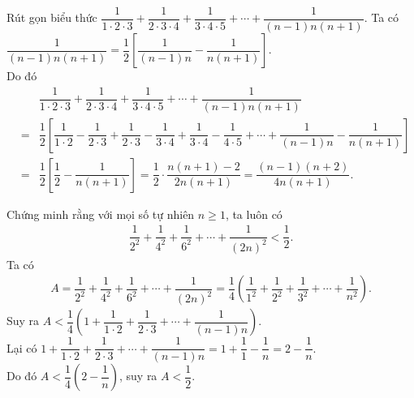 \begin{bt}%
 Rút gọn biểu thức $\dfrac{1}{1 \cdot 2 \cdot 3} + \dfrac{1}{2 \cdot 3 \cdot 4} + \dfrac{1}{3 \cdot 4 \cdot 5} + \cdots + \dfrac{1}{(n-1)n(n+1)}$.
 \loigiai
  {
  Ta có $\dfrac{1}{(n-1)n(n+1)} = \dfrac{1}{2}\left[\dfrac{1}{(n-1)n}-\dfrac{1}{n(n+1)}\right]$.\\
  Do đó
  \allowdisplaybreaks
  \begin{eqnarray*}
   & & \dfrac{1}{1 \cdot 2 \cdot 3} + \dfrac{1}{2 \cdot 3 \cdot 4} + \dfrac{1}{3 \cdot 4 \cdot 5} + \cdots + \dfrac{1}{(n-1)n(n+1)}\\
   &=& \dfrac{1}{2} \left[\dfrac{1}{1 \cdot 2} - \dfrac{1}{2 \cdot 3} + \dfrac{1}{2 \cdot 3}-\dfrac{1}{3 \cdot 4} + \dfrac{1}{3 \cdot 4}-\dfrac{1}{4 \cdot 5} + \cdots + \dfrac{1}{(n-1)n}-\dfrac{1}{n(n+1)}\right]\\
   &=& \dfrac{1}{2}\left[\dfrac{1}{2}-\dfrac{1}{n(n+1)}\right] = \dfrac{1}{2} \cdot \dfrac{n(n+1)-2}{2n(n+1)} = \dfrac{(n-1)(n+2)}{4n(n+1)}.
  \end{eqnarray*}
  }
\end{bt}

\begin{bt}%
 Chứng minh rằng với mọi số tự nhiên $n \geq 1$, ta luôn có
 \begin{eqnarray*}
  \dfrac{1}{2^2} + \dfrac{1}{4^2} + \dfrac{1}{6^2} + \cdots + \dfrac{1}{(2n)^2} < \dfrac{1}{2}.
 \end{eqnarray*}
 \loigiai
  {
  Ta có
  \allowdisplaybreaks
  \begin{eqnarray*}
   A = \dfrac{1}{2^2} + \dfrac{1}{4^2} + \dfrac{1}{6^2} + \cdots + \dfrac{1}{(2n)^2} = \dfrac{1}{4}\left(\dfrac{1}{1^2}+\dfrac{1}{2^2}+\dfrac{1}{3^2}+ \cdots +\dfrac{1}{n^2}\right).
  \end{eqnarray*}
  Suy ra $A < \dfrac{1}{4}\left(1+\dfrac{1}{1 \cdot 2} + \dfrac{1}{2 \cdot 3} + \cdots + \dfrac{1}{(n-1)n}\right)$.\\
  Lại có $1+\dfrac{1}{1 \cdot 2} + \dfrac{1}{2 \cdot 3} + \cdots + \dfrac{1}{(n-1)n} = 1 + \dfrac{1}{1}-\dfrac{1}{n}=2-\dfrac{1}{n}$.\\
  Do đó $A < \dfrac{1}{4} \left(2-\dfrac{1}{n}\right)$, suy ra $A<\dfrac{1}{2}$.
  }
\end{bt}

